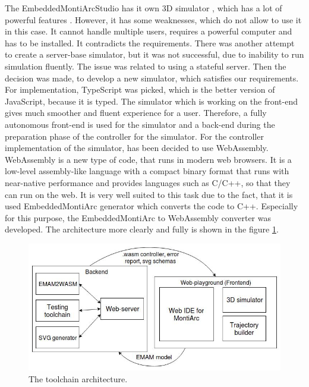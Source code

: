 The EmbeddedMontiArcStudio has it own 3D simulator \cite{DDE+17, Sim1BA17, Sim2BA17, Sim3MA17, Sim4MA17}, which has a lot of powerful features \cite{Sim5MA18,Sim6MA18,Sim7MA18,Sim8MA18}. However, it has some weaknesses, which do not allow to use it in this case. It cannot handle multiple users, requires a powerful computer and has to be installed. It contradicts the requirements. There was another attempt \cite{3dVisBA17} to create a server-base simulator, but it was not successful, due to inability to run simulation fluently. The issue was related to using a stateful server. Then the decision was made, to develop a new simulator, which satisfies our requirements. For implementation, TypeScript was picked, which is the better version of JavaScript, because it is typed. The simulator which is working on the front-end gives much smoother and fluent experience for a user. Therefore, a fully autonomous front-end is used for the simulator and a back-end during the preparation phase of the controller for the simulator. For the controller implementation of the simulator, has been decided to use WebAssembly. WebAssembly is a new type of code, that runs in modern web browsers. It is a low-level assembly-like language with a compact binary format that runs with near-native performance and provides languages such as C/C++, so that they can run on the web. It is very well suited to this task due to the fact, that it is used EmbeddedMontiArc generator which converts the code to C++. Especially for this purpose, the EmbeddedMontiArc to WebAssembly converter was developed. The architecture more clearly and fully is shown in the figure \ref{fig:architecture}.
\begin{figure}[h!]
    \centering
    \includegraphics[width=\linewidth]{src/pic/architecture}
    \caption{The toolchain architecture.}
    \label{fig:architecture}
\end{figure} \newline
